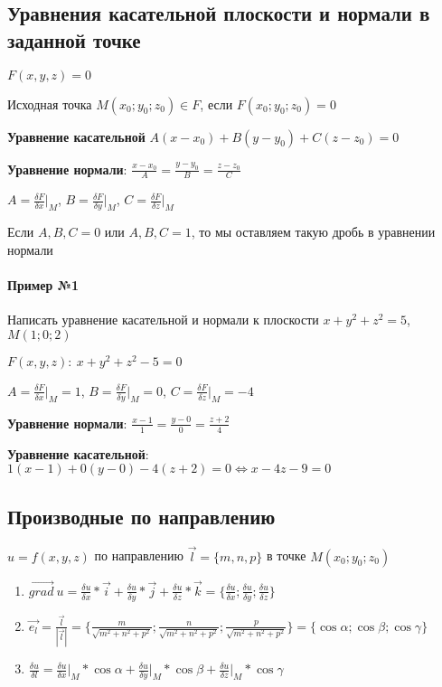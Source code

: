\documentclass{article}
\begin{document}
\subsection{Уравнения касательной плоскости и нормали в заданной точке}

$F(x, y, z) = 0$

Исходная точка $M(x_0; y_0; z_0) \in F$, если $F(x_0; y_0; z_0) = 0$

\hfill

\textbf{Уравнение касательной} $A(x - x_0) + B(y - y_0) + C(z - z_0) = 0$

\textbf{Уравнение нормали}: $\frac{x - x_0}{A} = \frac{y - y_0}{B} = \frac{z - z_0}{C}$

\hfill

$A = \frac{\delta F}{\delta x} \bigg|_{M}$, $B = \frac{\delta F}{\delta y} \bigg|_{M}$, $C = \frac{\delta F}{\delta z} \bigg|_{M}$

Если $A, B, C = 0$ или $A, B, C = 1$, то мы оставляем такую дробь в уравнении нормали

\paragraph{Пример №1} Написать уравнение касательной и нормали к плоскости $x + y^2 + z^2 = 5$, $M(1; 0; 2)$

$F(x, y, z): \ x + y^2 + z^2 - 5 = 0$

$A = \frac{\delta F}{\delta x} \bigg|_{M} = 1$, $B = \frac{\delta F}{\delta y} \bigg|_{M} = 0$, $C = \frac{\delta F}{\delta z} \bigg|_{M} = -4$

\textbf{Уравнение нормали}: $\frac{x - 1}{1} = \frac{y - 0}{0} = \frac{z + 2}{4}$

\textbf{Уравнение касательной}: $1 (x - 1) + 0 (y - 0) - 4 (z + 2) = 0 \Longleftrightarrow x - 4z - 9 = 0$

\subsection{Производные по направлению}

$u = f(x, y, z)$ по направлению $\vec{l} = \{ m, n, p \}$ в точке $M (x_0; y_0; z_0)$

\begin{enumerate}
    \item $\vec{grad} \ u = \frac{\delta u}{\delta x} * \vec{i} + \frac{\delta u}{\delta y} * \vec{j} + \frac{\delta u}{\delta z} * \vec{k} = \{ \frac{\delta u}{\delta x}; \frac{\delta u}{\delta y}; \frac{\delta u}{\delta z} \}$
    \item $\vec{e_{l}} = \frac{\vec{l}}{|\vec{l}|} = \{ \frac{m}{\sqrt{m^2 + n^2 + p^2}}; \frac{n}{\sqrt{m^2 + n^2 + p^2}}; \frac{p}{\sqrt{m^2 + n^2 + p^2}} \} = \{ \cos \alpha; \cos \beta; \cos \gamma \}$
    \item $\frac{\delta u}{\delta l} = \frac{\delta u}{\delta x} \bigg|_{M} * \cos \alpha + \frac{\delta u}{\delta y} \bigg|_{M} * \cos \beta + \frac{\delta u}{\delta z} \bigg|_{M} * \cos \gamma$
\end{enumerate}
\end{document}
